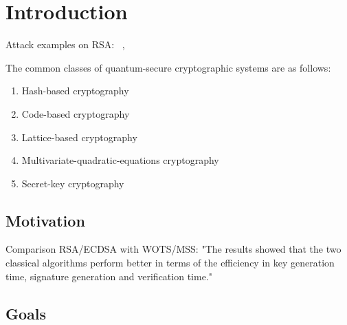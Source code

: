 \chapter{Introduction}
\label{cha:introduction}
Attack examples on RSA: ~\cite{RSA_pq-attack_examples_2018}, \cite{RSA_pq-attack_without_factorization_2018}

The common classes of quantum-secure cryptographic systems are as follows:~\cite{book_pqc_bernstein_2004}
\begin{enumerate}
\item Hash-based cryptography
\item Code-based cryptography
\item Lattice-based cryptography
\item Multivariate-quadratic-equations cryptography
\item Secret-key cryptography
\end{enumerate}

\section{Motivation}

Comparison RSA/ECDSA with WOTS/MSS:
"The results showed that the two classical algorithms perform better in terms of the efficiency in key generation time, signature generation and verification time."~\cite{comparison_performance_RSA_ECDSA_Merkle_WOTS_2021}


\section{Goals}

